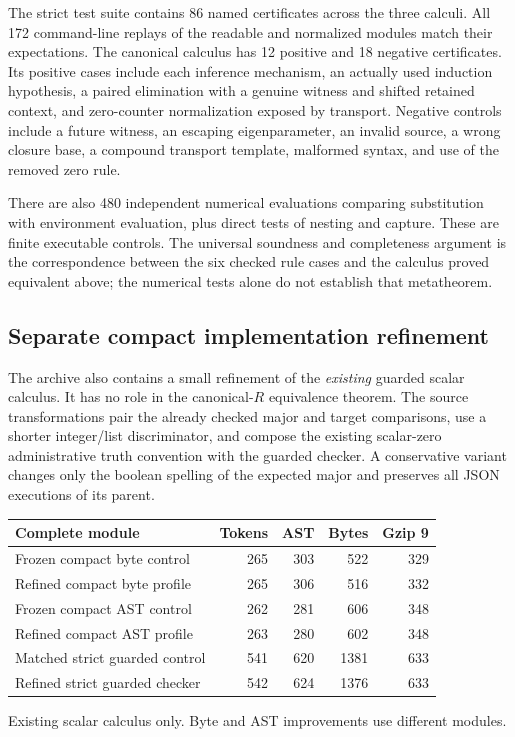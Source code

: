 \documentclass[11pt]{article}
\theoremstyle{definition}
\begin{document}
The strict test suite contains 86 named certificates across the three
calculi. All 172 command-line replays of the readable and normalized modules
match their expectations. The canonical calculus has 12 positive and 18
negative certificates. Its positive cases include each inference mechanism,
an actually used induction hypothesis, a paired elimination with a genuine
witness and shifted retained context, and zero-counter normalization exposed
by transport. Negative controls include a future witness, an escaping
eigenparameter, an invalid source, a wrong closure base, a compound transport
template, malformed syntax, and use of the removed zero rule.

There are also 480 independent numerical evaluations comparing substitution
with environment evaluation, plus direct tests of nesting and capture.
These are finite executable controls. The universal soundness and
completeness argument is the correspondence between the six checked rule
cases and the calculus proved equivalent above; the numerical tests alone
do not establish that metatheorem.

\subsection{Separate compact implementation refinement}
\label{sec:compact-refinement}

The archive also contains a small refinement of the \emph{existing} guarded
scalar calculus. It has no role in the canonical-$R$ equivalence theorem.
The source transformations pair the already checked major and target
comparisons, use a shorter integer/list discriminator, and compose the
existing scalar-zero administrative truth convention with the guarded
checker. A conservative variant changes only the boolean spelling of the
expected major and preserves all JSON executions of its parent.

\begin{center}
\small
\begin{tabular}{lrrrr}
\toprule
Complete module & Tokens & AST & Bytes & Gzip 9\\
\midrule
Frozen compact byte control & 265 & 303 & 522 & 329\\
Refined compact byte profile & 265 & 306 & 516 & 332\\
Frozen compact AST control & 262 & 281 & 606 & 348\\
Refined compact AST profile & 263 & 280 & 602 & 348\\
Matched strict guarded control & 541 & 620 & 1381 & 633\\
Refined strict guarded checker & 542 & 624 & 1376 & 633\\
\bottomrule
\end{tabular}
\par\smallskip
Existing scalar calculus only. Byte and AST improvements use different modules.
\end{center}
\end{document}
